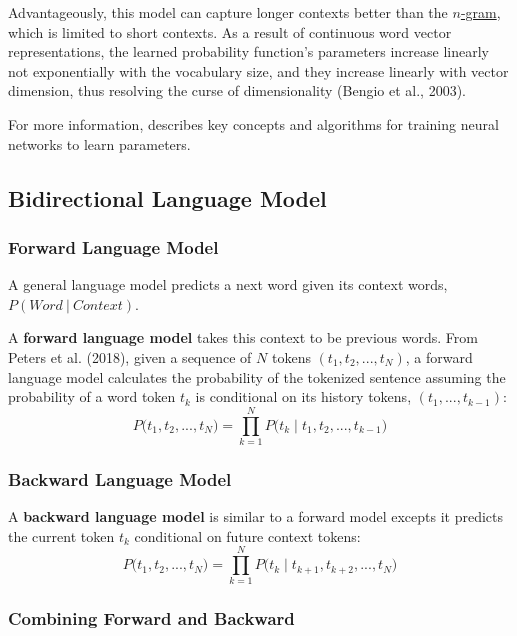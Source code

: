 Advantageously, this model can capture longer contexts better than the \hyperref[sec:NGramLM]{$n$-gram}, which is limited to short contexts. As a result of continuous word vector representations, the learned probability function's parameters increase linearly not exponentially with the vocabulary size, and they increase linearly with vector dimension, thus resolving the curse of dimensionality (Bengio et al., 2003).  

For more information,  describes key concepts and algorithms for training neural networks to learn parameters. 


\subsection{Bidirectional Language Model} \label{sec:BidirectionalLM}

\subsubsection{Forward Language Model} \label{sec:ForwardLM}

A general language model predicts a next word given its context words, $P(\textit{Word} \: | \: \textit{Context})$. 

A \textbf{forward language model} takes this context to be previous words. From Peters et al. (2018), given a sequence of $N$ tokens $(t_1, t_2, ..., t_N)$, a forward language model calculates the probability of the tokenized sentence assuming the probability of a word token $t_k$ is conditional on its history tokens, $(t_1, ..., t_{k-1})$:
$$
P \Big(t_1, t_2, ..., t_N \Big) = \prod_{k=1}^N P \Big(t_k \; | \; t_1, t_2, ..., t_{k-1} \Big)
$$

\subsubsection{Backward Language Model} \label{sec:BackwardLM}

A \textbf{backward language model} is similar to a forward model excepts it predicts the current token $t_k$ conditional on future context tokens:
$$
P \Big(t_1, t_2, ..., t_N \Big) = \prod_{k=1}^N P \Big(t_k \; | \; t_{k+1}, t_{k+2}, ..., t_N \Big)
$$

\subsubsection{Combining Forward and Backward}

